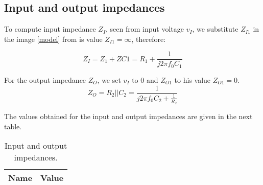  
 
\subsection{Input and output impedances}
\par To compute input impedance $Z_I$, seen from input voltage $v_I$, we substitute $Z_{I1}$ in the image \ref{model} from is value $Z_{I1}=\infty$, therefore:
 
\begin{equation}
  Z_I=Z_1+Z{C1}=R_1+\frac{1}{j2\pi f_0C_1}
\end{equation}
\par For the output impedance $Z_{O}$, we set $v_I$ to $0$ and $Z_{O1}$ to his value $Z_{O1}=0$.
\begin{equation}
  Z_O=R_2||C_2=\frac{1}{j2\pi f_0C_2+\frac{1}{R_2}}
\end{equation}

\par The values obtained for the input and output impedances are given in the next table.

\begin{table}[H]
   \centering
   \begin{tabular}{|l|r|}
     \hline    
     {\bf Name} & {\bf Value} \\ \hline
     
   \end{tabular}
   \caption{Input and output impedances.}
   \label{tab:freq}
\end{table}



  
 


 
 
